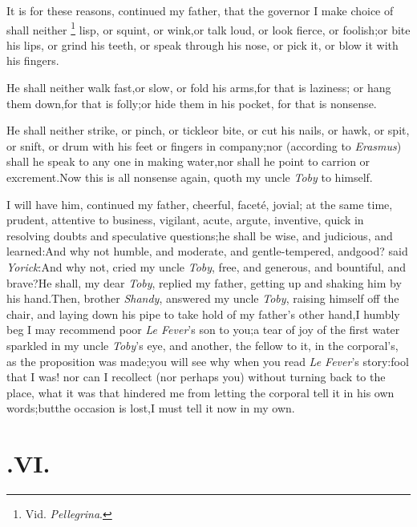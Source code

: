 \documentclass{article}
\begin{document}
It is for these reasons, continued my father, that the governor I make choice
of shall neither \footnote{Vid. \textit{Pellegrina}.} lisp, or
squint, or wink,\break or talk loud, or look fierce, or foolish;\break\tsh or bite
his lips, or grind his teeth, or speak through his nose, or pick it, or blow it
with his fingers.\tsh


He shall neither walk fast,\tsk or slow, or fold his
arms,\tsk for that is laziness; \tsk\break or hang them
down,\tsk for that is folly;\pb or hide them in his pocket, for that
is nonsense.\tsh

He shall neither strike, or pinch, or tickle\tsk or bite, or
cut his nails, or hawk, or spit, or snift, or drum with his feet or
fingers in company;\tsh nor (according to \textit{Erasmus})
shall he speak to any one in making water,\tsk nor shall he point to
carrion or excrement.\tsh Now this is all nonsense again,
quoth my uncle \textit{Toby} to himself.\tsh

I will have him, continued my father, cheerful, faceté,
jovial; at the same time, prudent, attentive to business, vigilant,
acute, argute, inventive, quick in resolving doubts and speculative
questions;\tsh he shall be wise, and judicious, and
learned:\tsh And why not humble, and moderate, and
gentle-tempered, and\pb good? said \textit{Yorick}:\tsh And why
not, cried my uncle \textit{Toby}, free, and generous, and bountiful,
and brave?\tsh He shall, my dear \textit{Toby}, replied my
father, getting up and shaking him by his hand.\tsk Then, brother
\textit{Shandy}, answered my uncle \textit{Toby}, raising himself off
the chair, and laying down his pipe to take hold of my
father’s other hand,\tsk I humbly beg I may recommend poor
\textit{Le Fever}’s son to you;\tsh a tear of joy of
the first water sparkled in my uncle \textit{Toby}’s eye, and
another, the fellow to it, in the corporal’s, as the
proposition was made;\tsh you will see why when you read \textit{Le
Fever}’s story:\tsh fool that I was! nor can I
recollect (nor perhaps you) without turning back to the place, what
it was that hindered me from letting the corporal tell it in his
own words;\tsk but\pb the occasion is lost,\tsk I must tell it now
in my own.






\section{.\enspace VI.}
\end{document}
